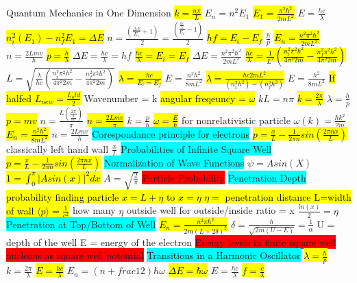 \documentclass[6pt, oneside]{article}   	%
\begin{document}
\colorbox{BurntOrange}{Quantum Mechanics in One Dimension}
\hl{$k =\frac{n\pi}{L}$}
$E_n=n^2 E_1$
\hl{$E_1=\frac{\pi^2 \hbar^2}{2mL^2}$}
$E=\frac{hc}{\lambda}$
\hl{$n_i^2(E_1) - n_f^2E_1 = \Delta E$}
$n=\frac{(\frac{\Delta E}{E_1} + 1)}{2} = \frac{(\frac{\frac{hc}{\lambda}}{E_1}-1)}{2}$
\hl{$hf = E_i - E_f$}
$\frac{h}{p}$
\hl{$E_n =\frac{ n^2 \pi^2 \hbar^2}{2mL^2}$}
$n = \frac{2Lmv}{h}$
\hl{$p=\frac{h}{\lambda}$}
$\Delta E = \frac{hc}{\lambda} = hf$
\hl{$\frac{hc}{\lambda} = E_i = E_f$}
$\Delta E  = \frac{n^2 \pi ^2 \hbar^2}{2mL^2}$
\hl{$\frac{hc}{\lambda} = \frac{1}{L^2}(\frac{n_i^2 \pi^2 h^2}{4\pi^2 2 m} - \frac{n_f^2 \pi^2 h^2}{4\pi^2 2 m})$}
$L = \sqrt{\frac{\lambda}{hc}(\frac{n_i^2 \pi^2 h^2}{4\pi^2 2 m} - \frac{n_f^2 \pi^2 h^2}{4\pi^2 2 m})}$
\hl{$\lambda = \frac{hc}{E_i = E_f}$}
$E = \frac{n^2 h^2}{8mL^2}$
\hl{$\lambda = \frac{hc 2mL^2}{(n_i^2 h^2)-(n_f^2 h^2)}$}
$E = \frac{h^2}{8mL^2}$
\hl{If halfed $L_{new} = \frac{L_old}{2}$}
Wavenumber = k
\hl{angular freqeuncy = $\omega$}
$kL = n\pi$
\hl{$k = \frac{2\pi}{\lambda}$}
$\lambda = \frac{h}{p}$
\hl{$p = mv$}
$n=\frac{L(\frac{2\pi}{\frac{h}{mv}})}{\pi}$
\hl{$n = \frac{2L mv}{\pi}$}
$k = \frac{p}{\hbar}$
\hl{$\omega = \frac{E}{\hbar}$}
for nonrelativistic particle $\omega(k) = \frac{\hbar k^2}{2m}$
\hl{$E_n = \frac{n^2 h^2}{8mL^2}$}
$n = \frac{2Lmv}{h}$
\colorbox{Cyan}{Corespondance principle for electrons}
\hl{$p = \frac{x}{L}-\frac{1}{2\pi n} sin(\frac{2\pi n x}{L})$}
classically left hand wall $\frac{x}{L}$
\colorbox{Cyan}{Probabilities of Infinite Square Well}
\hl{$p = \frac{x}{L}-\frac{1}{2\pi n} sin(\frac{2\pi n x}{L})$}
\colorbox{Cyan}{Normalization of Wave Functions}
$\psi = Asin(X)$
\hl{$1 = \int_0^{\pi} |Asin(x)|^2 dx$}
$A = \sqrt{\frac{2}{\pi}}$
\colorbox{Red}{Particle Probability}
\colorbox{Cyan}{Penetration Depth}
\hl{probability finding particle $ x = L+\eta$ to $x=\eta$ $\eta=$ penetration distance L=width of wall $\langle p \rangle = \frac{1}{e^2}$}
how many $\eta$ outside well for outside/inside ratio = x $\frac{ln(x)}{2} = \eta$
\colorbox{Cyan}{Penetration at Top/Bottom of Well}
\hl{$E_n = \frac{n^2 \pi \hbar^2}{2m(L+2\delta)^2}$}
$\delta = \frac{\hbar}{\sqrt{2m(U-E)}} = \frac{1}{\alpha}$ U = depth of the well E = energy of the electron
\colorbox{Red}{Energy levels in finite square well}
\colorbox{Red}{nucleaus as square well potential}
\colorbox{Cyan}{Transitions in a Harmonic Oscillator}
\hl{$\lambda = \frac{h}{p}$}
$k = \frac{2\pi}{\lambda}$
\hl{$E = \frac{hc}{\lambda}$}
$E_n = (n+frac{1}{2})\hbar \omega$
\hl{$\Delta E = \hbar \omega$}
$E = \frac{hc}{\lambda}$
\hl{$f = \frac{c}{\lambda}$}
\end{document}

